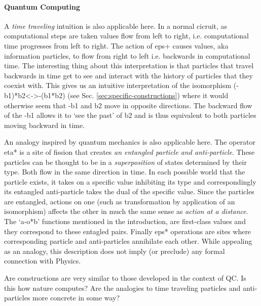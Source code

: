 \documentclass[preprint]{sigplanconf}
\begin{document}
\paragraph*{Quantum Computing} 
A \emph{time traveling} intuition is also applicable here.  In a
normal cicruit, as computational steps are taken values flow from left
to right, i.e. computational time progresses from left to right.  The
action of {{eps+}} causes values, aka information particles, to flow
from right to left i.e. backwards in computational time.  The
interesting thing about this interpretation is that particles that
travel backwards in time get to see and interact with the history of
particles that they coexist with. This gives us an intuitive
interpretation of the isomorphism {{(-b1)*b2<->-(b1*b2)}} (see
Sec. \ref{sec:specific-constructions}) where it would otherwise seem
that {{-b1}} and {{b2}} move in opposite directions. The backward flow
of the {{-b1}} allows it to `see the past' of {{b2}} and is thus
equivalent to both particles moving backward in time.

An analogy inspired by quantum mechanics is also applicable here.  The
operator {{eta*}} is a site of fission that creates \emph{an entangled
  particle and anti-particle}. These particles can be thought to be in
a \emph{superposition} of states determined by their type. Both flow
in the same direction in time.  In each possible world that the
particle exists, it takes on a specific value inhibiting its type and
correspondingly its entangled anti-particle takes the dual of the
specific value. Since the particles are entangled, actions on one
(such as transformation by application of an isomorphism) affects the
other in much the same sense as \emph{action at a distance}. The
`{{a-o*b}}' functions mentioned in the introduction, are first-class
values and they correspond to these entagled pairs. Finally {{eps*}}
operations are sites where corresponding particle and anti-particles
annihilate each other. While appealing as an analogy, this description
does not imply (or preclude) any formal connection with Physics.

Are constructions are very similar to those developed in the context
of QC. Is this how nature computes? Are the analogies to time
traveling particles and anti-particles more concrete in some way? 
\end{document}
